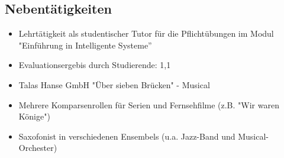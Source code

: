 
\subsection{Nebent\"atigkeiten}

{
	\begin{itemize} 
		\item Lehrt\"atigkeit als studentischer Tutor f\"ur die Pflicht\"ubungen im Modul "Einf\"uhrung in Intelligente Systeme''
		\item Evaluationsergebis durch Studierende: 1,1 
	\end{itemize}}

{
	\begin{itemize} 
		\item Talas Hanse GmbH "Über sieben Brücken" - Musical 
		\item Mehrere Komparsenrollen für Serien und Fernsehfilme (z.B. "Wir waren Könige")
		\item Saxofonist in verschiedenen Ensembels (u.a. Jazz-Band und Musical-Orchester)
\end{itemize}}





